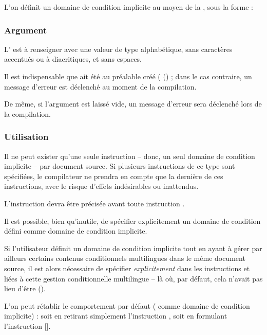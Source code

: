 \documentclass{article}
\begin{document}
L'on définit un domaine de condition implicite au moyen de la , sous la forme :


\subsubsection{Argument}
L' est à renseigner avec une valeur de type alphabétique, sans caractères accentués ou à diacritiques, et sans espaces.

Il est indispensable que  ait été au préalable créé ( () ; dans le cas contraire, un message d'erreur est déclenché au moment de la compilation.

De même, si l’argument  est laissé vide, un message d’erreur sera déclenché lors de la compilation.

\subsubsection{Utilisation}
Il ne peut exister qu'une seule instruction  -- donc, un seul domaine de condition implicite -- par document source. Si plusieurs instructions de ce type sont spécifiées, le compilateur ne prendra en compte que la dernière de ces instructions, avec le risque d'effets indésirables ou inattendus.

L'instruction  devra être précisée avant toute instruction .

Il est possible, bien qu'inutile, de spécifier explicitement un domaine de condition défini comme domaine de condition implicite.

Si l'utilisateur définit un domaine de condition implicite tout en ayant à gérer par ailleurs certains contenus conditionnels multilingues dans le même document source, il est alors nécessaire de spécifier \emph{explicitement}  dans les instructions  et  liées à cette gestion conditionnelle multilingue -- là où, par défaut, cela n'avait pas lieu d'être ().

L'on peut rétablir le comportement par défaut ( comme domaine de condition implicite) : soit en retirant simplement l'instruction , soit en formulant l'instruction [].
\end{document}
